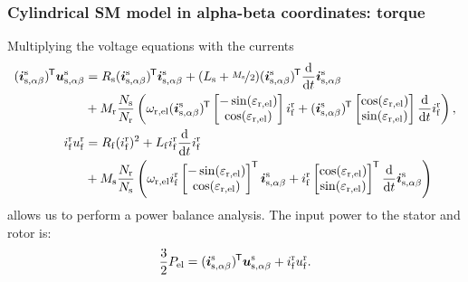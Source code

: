 \begin{frame}
	\frametitle{Cylindrical SM model in alpha-beta coordinates: torque}
	Multiplying the voltage equations with the currents 
	\begin{equation*}
		\begin{split}
			(\bm{i}^\mathrm{s}_\mathrm{s,\alpha\beta})^{\mkern-1.5mu\mathsf{T}}\bm{u}^\mathrm{s}_\mathrm{s,\alpha\beta} &= R_\mathrm{s} (\bm{i}^\mathrm{s}_\mathrm{s,\alpha\beta})^{\mkern-1.5mu\mathsf{T}}\bm{i}^\mathrm{s}_\mathrm{s,\alpha\beta}+ (L_\mathrm{s} +\nicefrac{M_\mathrm{s}}{2}) (\bm{i}^\mathrm{s}_\mathrm{s,\alpha\beta})^{\mkern-1.5mu\mathsf{T}}\frac{\mathrm{d}}{\mathrm{d}t}\bm{i}^\mathrm{s}_\mathrm{s,\alpha\beta} \\&+ M_\mathrm{r}\frac{N_\mathrm{s}}{N_\mathrm{r}} \left(\omega_\mathrm{r,el}(\bm{i}^\mathrm{s}_\mathrm{s,\alpha\beta})^{\mkern-1.5mu\mathsf{T}}\begin{bmatrix}-\sin(\varepsilon_\mathrm{r,el})\\ \cos(\varepsilon_\mathrm{r,el})\end{bmatrix}i^\mathrm{r}_{\mathrm{f}}  + (\bm{i}^\mathrm{s}_\mathrm{s,\alpha\beta})^{\mkern-1.5mu\mathsf{T}}\begin{bmatrix}\cos(\varepsilon_\mathrm{r,el})\\ \sin(\varepsilon_\mathrm{r,el})\end{bmatrix} \frac{\mathrm{d}}{\mathrm{d}t}i^\mathrm{r}_{\mathrm{f}}\right),\\
			i^\mathrm{r}_\mathrm{f}u^\mathrm{r}_\mathrm{f} &= R_\mathrm{f} (i^\mathrm{r}_\mathrm{f})^2 + L_\mathrm{f} i^\mathrm{r}_\mathrm{f} \frac{\mathrm{d}}{\mathrm{d}t}i^\mathrm{r}_\mathrm{f} \\&+ M_{\mathrm{s}}\frac{N_\mathrm{r}}{N_\mathrm{s}} \left(\omega_\mathrm{r,el}i^\mathrm{r}_\mathrm{f} \begin{bmatrix}-\sin(\varepsilon_\mathrm{r,el})\\ \cos(\varepsilon_\mathrm{r,el})\end{bmatrix}^{\mkern-1.5mu\mathsf{T}} \bm{i}^\mathrm{s}_\mathrm{s,\alpha\beta} + i^\mathrm{r}_\mathrm{f}\begin{bmatrix}\cos(\varepsilon_\mathrm{r,el})\\ \sin(\varepsilon_\mathrm{r,el})\end{bmatrix}^{\mkern-1.5mu\mathsf{T}} \frac{\mathrm{d}}{\mathrm{d}t} \bm{i}^\mathrm{s}_\mathrm{s,\alpha\beta}\right)
		\end{split}
	\end{equation*}
	allows us to perform a power balance analysis. The input power to the stator and rotor is:
	\begin{equation*}
			\frac{3}{2}P_\mathrm{el} = (\bm{i}^\mathrm{s}_\mathrm{s,\alpha\beta})^{\mkern-1.5mu\mathsf{T}}\bm{u}^\mathrm{s}_\mathrm{s,\alpha\beta} + i^\mathrm{r}_\mathrm{f}u^\mathrm{r}_\mathrm{f} .
	\end{equation*}
\end{frame}

